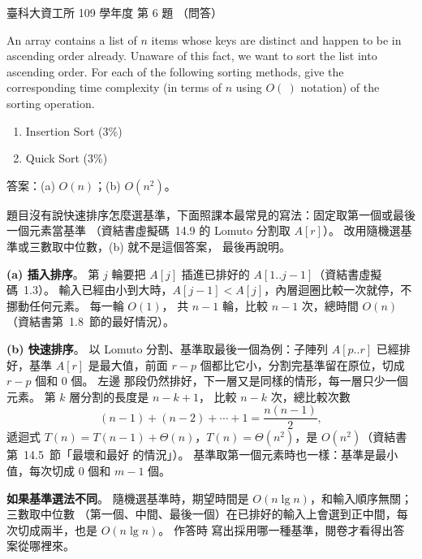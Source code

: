 \begin{pastexam}[label={px:ntust-109-ice-06}]{臺科大資工所 109 學年度 第 6 題}
（問答）

An array contains a list of $n$ items whose keys are distinct and happen to be in ascending order
already. Unaware of this fact, we want to sort the list into ascending order. For each of the
following sorting methods, give the corresponding time complexity (in terms of $n$ using $O(\ )$
notation) of the sorting operation.
\begin{enumerate}[label=(\alph*)]
\item Insertion Sort (3\%)
\item Quick Sort (3\%)
\end{enumerate}
\end{pastexam}

\begin{pastsoln}
答案：(a) $O(n)$；(b) $O(n^2)$。

題目沒有說快速排序怎麼選基準，下面照課本最常見的寫法：固定取第一個或最後一個元素當基準
（資結書虛擬碼~14.9 的 Lomuto 分割取 $A[r]$）。 改用隨機選基準或三數取中位數，(b) 就不是這個答案，
最後再說明。

\textbf{(a) 插入排序}。 第 $j$ 輪要把 $A[j]$ 插進已排好的 $A[1..j-1]$（資結書虛擬碼~1.3）。
輸入已經由小到大時，$A[j-1] < A[j]$，內層迴圈比較一次就停，不挪動任何元素。 每一輪 $O(1)$，
共 $n - 1$ 輪，比較 $n - 1$ 次，總時間 $O(n)$（資結書第~1.8~節的最好情況）。

\textbf{(b) 快速排序}。 以 Lomuto 分割、基準取最後一個為例：子陣列 $A[p..r]$ 已經排好，基準
$A[r]$ 是最大值，前面 $r - p$ 個都比它小，分割完基準留在原位，切成 $r - p$ 個和 $0$ 個。 左邊
那段仍然排好，下一層又是同樣的情形，每一層只少一個元素。 第 $k$ 層分割的長度是 $n - k + 1$，
比較 $n - k$ 次，總比較次數
\[
(n - 1) + (n - 2) + \cdots + 1 = \frac{n(n-1)}{2},
\]
遞迴式 $T(n) = T(n-1) + \Theta(n)$，$T(n) = \Theta(n^2)$，是 $O(n^2)$（資結書第~14.5~節「最壞和最好
的情況」）。 基準取第一個元素時也一樣：基準是最小值，每次切成 $0$ 個和 $m - 1$ 個。

\textbf{如果基準選法不同}。 隨機選基準時，期望時間是 $O(n \lg n)$，和輸入順序無關；三數取中位數
（第一個、中間、最後一個）在已排好的輸入上會選到正中間，每次切成兩半，也是 $O(n \lg n)$。 作答時
寫出採用哪一種基準，閱卷才看得出答案從哪裡來。
\end{pastsoln}
